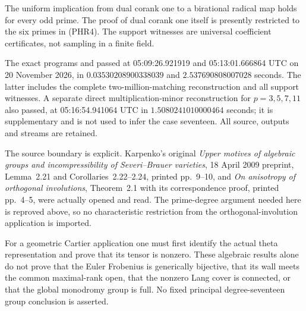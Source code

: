 \begin{remark}
\label{rem:prime-Heisenberg-rank-scope}
The uniform implication from dual corank one to a birational
radical map holds for every odd prime. The proof of dual corank
one itself is presently restricted to the six primes in (PHR4).
The support witnesses are universal coefficient certificates,
not sampling in a finite field.

The exact programs
and
passed at 05:09:26.921919 and 05:13:01.666864 UTC on
20 November 2026, in \(0.03530208900338039\) and
\(2.537690808007028\) seconds. The latter includes the complete
two-million-matching reconstruction and all support witnesses.
A separate direct multiplication-minor reconstruction for
\(p=3,5,7,11\) also passed, at 05:16:54.941064 UTC in
\(1.5080241010000464\) seconds; it is supplementary and is not
used to infer the case seventeen.
All source, outputs and streams are retained.

The source boundary is explicit. Karpenko's original
\emph{Upper motives of algebraic groups and incompressibility of
Severi--Brauer varieties}, 18 April 2009 preprint,
Lemma~2.21 and Corollaries~2.22--2.24, printed pp.~9--10, and
\emph{On anisotropy of orthogonal involutions}, Theorem~2.1
with its correspondence proof, printed pp.~4--5, were actually
opened and read. The prime-degree argument needed here is
reproved above, so no characteristic restriction from the
orthogonal-involution application is imported.

For a geometric Cartier application one must first identify the
actual theta representation and prove that its tensor is nonzero.
These algebraic results alone do not prove that the Euler
Frobenius is generically bijective, that its wall meets the common
maximal-rank open, that the nonzero Lang cover is connected, or
that the global monodromy group is full. No fixed principal
degree-seventeen group conclusion is asserted.
\end{remark}
